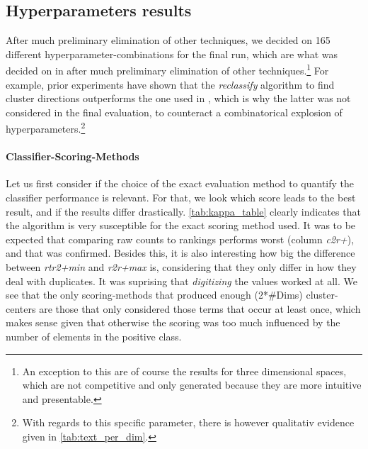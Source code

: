 

\subsection{Hyperparameters results}

After much preliminary elimination of other techniques, we decided on 165 different hyperparameter-combinations for the final run, which are what was decided on in after much preliminary elimination of other techniques.\footnote{An exception to this are of course the results for three dimensional spaces, which are not competitive and only generated because they are more intuitive and presentable.} For example, prior experiments have shown that the \textit{reclassify} algorithm to find cluster directions outperforms the one used in \cite{Derrac2015}, which is why the latter was not considered in the final evaluation, to counteract a combinatorical explosion of hyperparameters.\footnote{With regards to this specific parameter, there is however qualitativ evidence given in \autoref{tab:text_per_dim}.}

\paragraph{Classifier-Scoring-Methods}

Let us first consider if the choice of the exact evaluation method to quantify the classifier performance is relevant. For that, we look which score leads to the best result, and if the results differ drastically. \autoref{tab:kappa_table} clearly indicates that the algorithm is very susceptible for the exact scoring method used. It was to be expected that comparing raw counts to rankings performs worst (column \textit{c2r+}), and that was confirmed. Besides this, it is also interesting how big the difference between \textit{rtr2+min} and \textit{r2r+max} is, considering that they only differ in how they deal with duplicates. It was suprising that \textit{digitizing} the values 
worked at all. We see that the only scoring-methods that produced enough (2*\#Dims) cluster-centers are those that only considered those terms that occur at least once, which makes sense given that otherwise the scoring was too much influenced by the number of elements in the positive class. 


